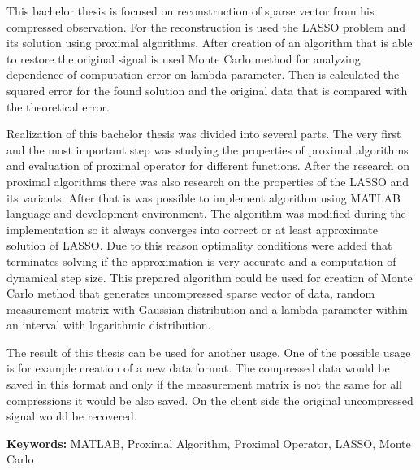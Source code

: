 \documentclass[FM,BP]{tulthesis}
\begin{document}
\vspace{2cm}
\begin{abstractEN}
This bachelor thesis is focused on reconstruction of sparse vector from his compressed observation. For the reconstruction is used the LASSO problem and its solution using proximal algorithms. After creation of an algorithm that is able to restore the original signal is used Monte Carlo method for analyzing dependence of computation error on lambda parameter. Then is calculated the squared error for the found solution and the original data that is compared with the theoretical error.


Realization of this bachelor thesis was divided into several parts. The very first and the most important step was studying the properties of proximal algorithms and evaluation of proximal operator for different functions. After the research on proximal algorithms there was also research on the properties of the LASSO and its variants. After that is was possible to implement algorithm using MATLAB language and development environment. The algorithm was modified during the implementation so it always converges into correct or at least approximate solution of LASSO. Due to this reason optimality conditions were added that terminates solving if the approximation is very accurate and a computation of dynamical step size. This prepared algorithm could be used for creation of Monte Carlo method that generates uncompressed sparse vector of data, random measurement matrix with Gaussian distribution and a lambda parameter within an interval with logarithmic distribution.


The result of this thesis can be used for another usage. One of the possible usage is for example creation of a new data format. The compressed data would be saved in this format and only if the measurement matrix is not the same for all compressions it would be also saved. On the client side the original uncompressed signal would be recovered.


\textbf{Keywords:} MATLAB, Proximal Algorithm, Proximal Operator, LASSO, Monte Carlo
\end{abstractEN}
\clearpage
\tableofcontents

\listoffigures

\newcommand{\listequationsname}{Seznam vzorců}
\newlistof{myequations}{equ}{\listequationsname}
\newcommand{\myequations}[1]{%
	\addcontentsline{equ}{myequations}{\protect\numberline{}#1}\par}
\setlength{\cftmyequationsnumwidth}{0.0em}
\listofmyequations
\end{document}
